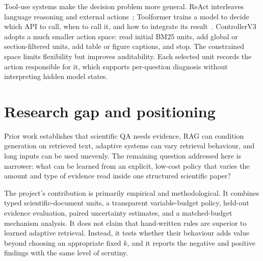 Tool-use systems make the decision problem more general. ReAct interleaves language reasoning and external actions~\cite{yao2023react}; Toolformer trains a model to decide which API to call, when to call it, and how to integrate its result~\cite{schick2023toolformer}. ControllerV3 adopts a much smaller action space: read initial BM25 units, add global or section-filtered units, add table or figure captions, and stop. The constrained space limits flexibility but improves auditability. Each selected unit records the action responsible for it, which supports per-question diagnosis without interpreting hidden model states.

\section{Research gap and positioning}

Prior work establishes that scientific QA needs evidence, RAG can condition generation on retrieved text, adaptive systems can vary retrieval behaviour, and long inputs can be used unevenly. The remaining question addressed here is narrower: what can be learned from an explicit, low-cost policy that varies the amount and type of evidence read inside one structured scientific paper?

The project's contribution is primarily empirical and methodological. It combines typed scientific-document units, a transparent variable-budget policy, held-out evidence evaluation, paired uncertainty estimates, and a matched-budget mechanism analysis. It does not claim that hand-written rules are superior to learned adaptive retrieval. Instead, it tests whether their behaviour adds value beyond choosing an appropriate fixed $k$, and it reports the negative and positive findings with the same level of scrutiny.

